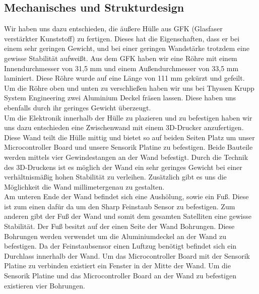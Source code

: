 \subsection{Mechanisches und Strukturdesign}
Wir haben uns dazu entschieden, die äußere Hülle aus GFK (Glasfaser verstärkter Kunststoff) zu fertigen. Dieses hat die Eigenschaften, dass er bei einem sehr geringen Gewicht, und bei einer geringen Wandstärke trotzdem eine gewisse Stabilität aufweißt. Aus dem GFK haben wir eine Röhre mit einem Innendurchmesser von 31,5 mm und einem Außendurchmesser von 33,5 mm laminiert. Diese Röhre wurde auf eine Länge von 111 mm gekürzt und gefeilt. Um die Röhre oben und unten zu verschließen haben wir uns bei Thyssen Krupp System Engineering zwei Aluminium Deckel fräsen lassen. Diese haben uns ebenfalls durch ihr geringes Gewicht überzeugt. \\
Um die Elektronik innerhalb der Hülle zu plazieren und zu befestigen haben wir uns dazu entschieden eine Zwischenwand mit einem 3D-Drucker anzufertigen. Diese Wand teilt die Hülle mittig und bietet so auf beiden Seiten Platz um unser Microcontroller Board und unsere Sensorik Platine zu befestigen. Beide Bauteile werden mittels vier Gewindestangen an der Wand befestigt. Durch die Technik des 3D-Druckens ist es möglich der Wand ein sehr geringes Gewicht bei einer verhältnismäßig hohen Stabilität zu verleihen. Zusätzlich gibt es uns die Möglichkeit die Wand millimetergenau zu gestalten. \\
Am unteren Ende der Wand befindet sich eine Aushölung, sowie ein Fuß. Diese ist zum einen dafür da um den Sharp Feinstaub Sensor zu befestigen. Zum anderen gibt der Fuß der Wand und somit dem gesamten Satelliten eine gewisse Stabilität. Der Fuß besitzt auf der einen Seite der Wand Bohrungen. Diese Bohrungen werden verwendet um die Aluminiumdeckel an der Wand zu befestigen. Da der Feinstaubsensor einen Luftzug benötigt befindet sich ein Durchlass innerhalb der Wand. Um das Microcontroller Board mit der Sensorik Platine zu verbinden existiert ein Fenster in der Mitte der Wand. Um die Sensorik Platine und das Microcontroller Board an der Wand zu befestigen existieren vier Bohrungen.
